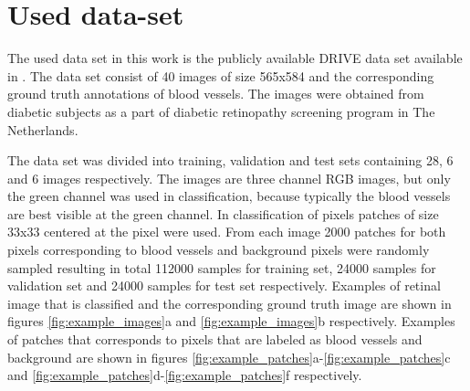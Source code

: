 \documentclass[aps,prb,10pt,twocolumn,groupedaddress]{revtex4-1}
\begin{document}
\section{Used data-set}
\label{sec:used_data_set}
The used data set in this work is the publicly available DRIVE data set \cite{staal} available in \cite{driveurl}. The data set consist of 40 images of size 565x584 and the corresponding ground truth annotations of blood vessels. The images were obtained from diabetic subjects as a part of diabetic retinopathy screening program in The Netherlands.

The data set was divided into training, validation and test sets containing 28, 6 and 6 images respectively. The images are three channel RGB images, but only the green channel was used in classification, because typically the blood vessels are best visible at the green channel. In classification of pixels patches of size 33x33 centered at the pixel were used. From each image 2000 patches for both pixels corresponding to blood vessels and background pixels were randomly sampled resulting in total 112000 samples for training set, 24000 samples for validation set and 24000 samples for test set respectively. Examples of retinal image that is classified and the corresponding ground truth image are shown in figures \ref{fig:example_images}a and \ref{fig:example_images}b respectively. Examples of patches that corresponds to pixels that are labeled as blood vessels and background are shown in figures \ref{fig:example_patches}a-\ref{fig:example_patches}c and \ref{fig:example_patches}d-\ref{fig:example_patches}f respectively.
\end{document}
